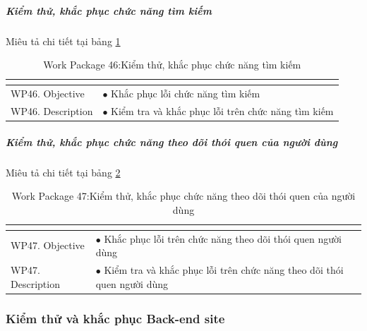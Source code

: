 \documentclass[a4paper]{book}
\begin{document}
\subparagraph{Kiểm thử, khắc phục chức năng tìm kiếm} Miêu tả chi tiết tại bảng \ref{table:kt_kp_chucnang_timkiem}
\begin{table}[h!]
	\begin{center}
		\begin{tabular}{|p{4cm}|p{10cm}|}
			\hline
			\multicolumn{2}{|c|}{\cellcolor[HTML]{363636}{\color[HTML]{FFFFFF}Work package 46: Kiểm thử, khắc phục chức năng tìm kiếm}}\\
			\hline
			\multirow{1}{*}{WP46. Objective} & $\bullet$ Khắc phục lỗi chức năng tìm kiếm\\
			\hline
			\multirow{1}{*}{WP46. Description} & $\bullet$ Kiểm tra và khắc phục lỗi trên chức năng tìm kiếm \\
			\hline
		\end{tabular}
		\caption{Work Package 46:Kiểm thử, khắc phục chức năng tìm kiếm}
		\label{table:kt_kp_chucnang_timkiem}
	\end{center}
\end{table}
\subparagraph{Kiểm thử, khắc phục chức năng theo dõi thói quen của người dùng} Miêu tả chi tiết tại bảng \ref{table:kt_kp_chucnang_thoiquen_nguoidung}
\begin{table}[h!]
	\begin{center}
		\begin{tabular}{|p{4cm}|p{10cm}|}
			\hline
			\multicolumn{2}{|c|}{\cellcolor[HTML]{363636}{\color[HTML]{FFFFFF}Work package 47: Kiểm thử, khắc phục chức năng theo dõi thói quen của người dùng}}\\
			\hline
			\multirow{1}{*}{WP47. Objective} & $\bullet$ Khắc phục lỗi trên chức năng theo dõi thói quen người dùng\\
			\hline
			\multirow{1}{*}{WP47. Description} & $\bullet$ Kiểm tra và khắc phục lỗi trên chức năng theo dõi thói quen người dùng \\
			\hline
		\end{tabular}
		\caption{Work Package 47:Kiểm thử, khắc phục chức năng theo dõi thói quen của người dùng}
		\label{table:kt_kp_chucnang_thoiquen_nguoidung}
	\end{center}
\end{table}
\subsubsection{Kiểm thử và khắc phục Back-end site}
\end{document}
